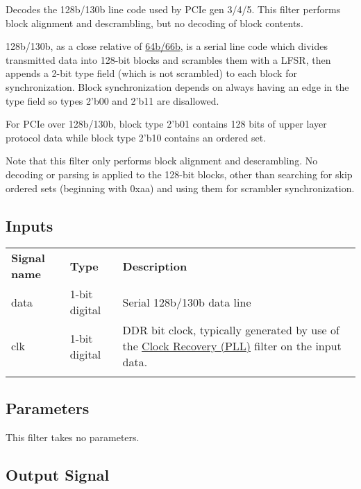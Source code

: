 Decodes the 128b/130b line code used by PCIe gen 3/4/5. This filter performs block alignment and descrambling, but no
decoding of block contents.

128b/130b, as a close relative of \hyperref[filter:128b130b]{64b/66b}, is a serial line code which divides transmitted
data into 128-bit blocks and scrambles them with a LFSR, then appends a 2-bit type field (which is not scrambled) to
each block for synchronization. Block synchronization depends on always having an edge in the type field so types 2'b00
and 2'b11 are disallowed.

For PCIe over 128b/130b, block type 2'b01 contains 128 bits of upper layer protocol data while block type 2'b10
contains an ordered set.

Note that this filter only performs block alignment and descrambling. No decoding or parsing is applied to the 128-bit
blocks, other than searching for skip ordered sets (beginning with 0xaa) and using them for scrambler synchronization.


\subsection{Inputs}

\begin{tabularx}{16cm}{llX}
\thickhline
\textbf{Signal name} & \textbf{Type} & \textbf{Description} \\
\thickhline
data & 1-bit digital & Serial 128b/130b data line \\
\thinhline
clk & 1-bit digital & DDR bit clock, typically generated by use of the \hyperref[filter:cdrpll]{Clock Recovery
(PLL)} filter on the input data.\\
\thickhline
\end{tabularx}

\subsection{Parameters}

This filter takes no parameters.

\subsection{Output Signal}

